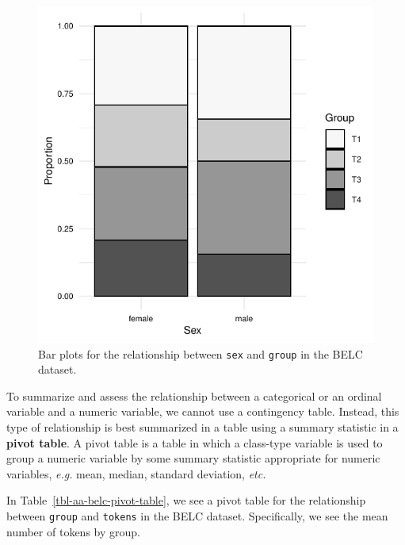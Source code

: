 \documentclass[
  letterpaper,
]{latex/krantz}
\theoremstyle{definition}
\theoremstyle{remark}
\begin{document}
\begin{figure}[H]
\begin{minipage}{0.50\linewidth}
{\includegraphics{part_2/3_analysis_files/figure-pdf/fig-aa-belc-bar-plots-2.pdf}

}


\end{minipage}%

\caption{\label{fig-aa-belc-bar-plots}Bar plots for the relationship
between \texttt{sex} and \texttt{group} in the BELC dataset.}

\end{figure}%

To summarize and assess the relationship between a categorical or an
ordinal variable and a numeric variable, we cannot use a contingency
table. Instead, this type of relationship is best summarized in a table
using a summary statistic in a \textbf{pivot table}. A pivot table is a
table in which a class-type variable is used to group a numeric variable
by some summary statistic appropriate for numeric variables, \emph{e.g.}
mean, median, standard deviation, \emph{etc.}

In Table~\ref{tbl-aa-belc-pivot-table}, we see a pivot table for the
relationship between \texttt{group} and \texttt{tokens} in the BELC
dataset. Specifically, we see the mean number of tokens by group.
\end{document}
